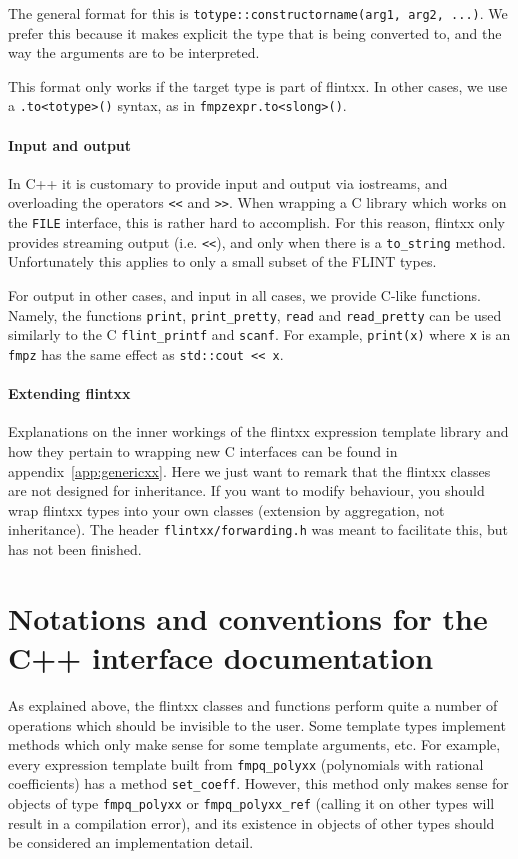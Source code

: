 \documentclass[a4paper,10pt]{book}
\newcommand{\code}{\lstinline}
\begin{document}
{{The general format for this is \code{totype::constructorname(arg1, arg2, ...)}.
We prefer this because it makes explicit the type that is being converted to,
and the way the arguments are to be interpreted.

This format only works if the target type is part of flintxx. In other cases, we
use a \code{.to<totype>()} syntax, as in \code{fmpzexpr.to<slong>()}.

\paragraph{Input and output}

In C++ it is customary to provide input and output via iostreams, and
overloading the operators \code{<<} and \code{>>}. When wrapping a C library
which works on the \code{FILE} interface, this is rather hard to accomplish. For
this reason, flintxx only provides streaming output (i.e. \code{<<}), and only
when there is a \code{to_string} method. Unfortunately this applies to only a
small subset of the FLINT types.

For output in other cases, and input in all cases, we provide C-like functions.
Namely, the functions \code{print}, \code{print_pretty}, \code{read} and
\code{read_pretty} can be used similarly to the C \code{flint_printf} and \code{scanf}.
For example, \code{print(x)} where \code{x} is an \code{fmpz} has the same
effect as \code{std::cout << x}.

\paragraph{Extending flintxx}

Explanations on the inner workings of the flintxx expression template library
and how they pertain to wrapping new C interfaces can be found in
appendix~\ref{app:genericxx}. Here we just want to remark that the flintxx
classes are not designed for inheritance. If you want to modify behaviour, you
should wrap flintxx types into your own classes (extension by aggregation, not
inheritance). The header \code{flintxx/forwarding.h} was meant to facilitate
this, but has not been finished.

\section{Notations and conventions for the C++ interface documentation}
As explained above, the flintxx classes and functions perform quite a number of
operations which should be invisible to the user. Some template types implement
methods which only make sense for some template arguments, etc. For example,
every expression template built from \code{fmpq_polyxx} (polynomials with
rational coefficients) has a method \code{set_coeff}. However, this method only
makes sense for objects of type \code{fmpq_polyxx} or \code{fmpq_polyxx_ref}
(calling it on other types will result in a compilation error),
and its existence in objects of other types should be considered an
implementation detail.

}}
\end{document}
